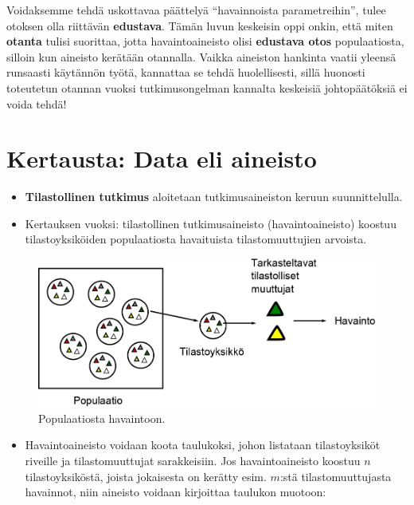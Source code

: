 \documentclass[
]{book}
\providecommand{\tightlist}{%
  \setlength{\itemsep}{0pt}\setlength{\parskip}{0pt}}
\begin{document}
Voidaksemme tehdä uskottavaa päättelyä ``havainnoista parametreihin'', tulee otoksen olla riittävän \textbf{edustava}. Tämän luvun keskeisin oppi onkin, että miten \textbf{otanta} tulisi suorittaa, jotta havaintoaineisto olisi \textbf{edustava otos} populaatiosta, silloin kun aineisto kerätään otannalla. Vaikka aineiston hankinta vaatii yleensä runsaasti käytännön työtä, kannattaa se tehdä huolellisesti, sillä huonosti toteutetun otannan vuoksi tutkimusongelman kannalta keskeisiä johtopäätöksiä ei voida tehdä!

\hypertarget{alaluku51}{%
\section{Kertausta: Data eli aineisto}\label{alaluku51}}

\begin{itemize}
\tightlist
\item
  \textbf{Tilastollinen tutkimus} aloitetaan tutkimusaineiston keruun suunnittelulla.
\item
  Kertauksen vuoksi: tilastollinen tutkimusaineisto (havaintoaineisto) koostuu tilastoyksiköiden populaatiosta havaituista tilastomuuttujien arvoista.
\end{itemize}

\begin{figure}
\includegraphics[width=0.9\linewidth]{images/populaatiostahavaintoon} \caption{Populaatiosta havaintoon.}\label{fig:pophav}
\end{figure}

\begin{itemize}
\tightlist
\item
  Havaintoaineisto voidaan koota taulukoksi, johon listataan tilastoyksiköt riveille ja tilastomuuttujat sarakkeisiin. Jos havaintoaineisto koostuu \(n\) tilastoyksiköstä, joista jokaisesta on kerätty esim. \(m\):stä tilastomuuttujasta havainnot, niin aineisto voidaan kirjoittaa taulukon muotoon:
\end{itemize}
\end{document}
